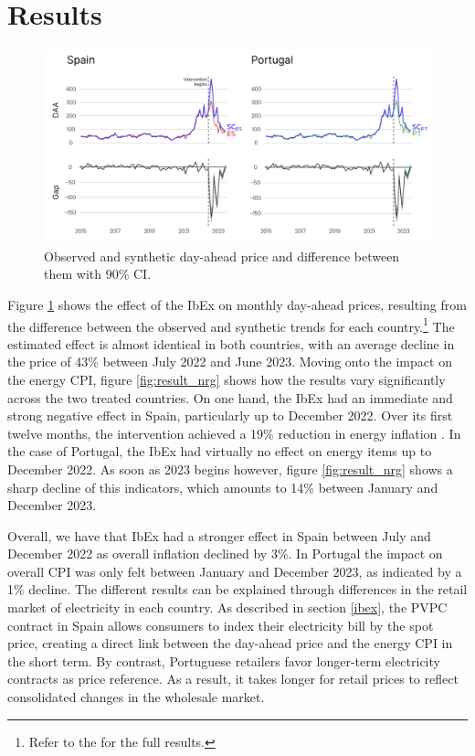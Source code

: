 \documentclass[12pt,a4paper]{article}
\begin{document}
\section{Results}\label{results}
\begin{figure}[!h]
    \centering 
    \includegraphics[width = .9\linewidth]{DAA_12.png}
    \caption{Observed and synthetic day-ahead price and difference between them with 90\% CI.}
    \label{fig:result_daa}
\end{figure}
Figure \ref{fig:result_daa} shows the effect of the IbEx on monthly day-ahead prices, resulting from the difference between the observed and synthetic trends for each country.\footnote{Refer to the  for the full results.} The estimated effect is almost identical in both countries, with an average decline in the price of 43\% between July 2022 and June 2023. Moving onto the impact on the energy CPI, figure \ref{fig:result_nrg} shows how the results vary significantly across the two treated countries. On one hand, the IbEx had an immediate and strong negative effect in Spain, particularly up to December 2022. Over its first twelve months, the intervention achieved a 19\% reduction in energy inflation . In the case of Portugal, the IbEx had virtually no effect on energy items up to December 2022. As soon as 2023 begins however, figure \ref{fig:result_nrg} shows a sharp decline of this indicators, which amounts to 14\% between January and December 2023.\par 
Overall, we have that IbEx had a stronger effect in Spain between July and December 2022 as overall inflation declined by 3\%. In Portugal the impact on overall CPI was only felt between January and December 2023, as indicated by a 1\% decline. The different results can be explained through differences in the retail market of electricity in each country. As described in section \ref{ibex}, the PVPC contract in Spain allows consumers to index their electricity bill by the spot price, creating a direct link between the day-ahead price and the energy CPI in the short term. By contrast, Portuguese retailers favor longer-term electricity contracts as price reference. As a result, it takes longer for retail prices to reflect consolidated changes in the wholesale market.\par
\end{document}
